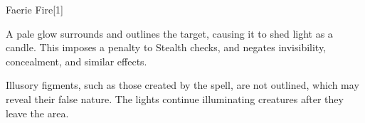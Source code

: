 
\begin{spellsection}{Faerie Fire}[1]
    \begin{spellheader}
    \end{spellheader}
    \begin{spellcontent}
        \begin{spelltargetinginfo}
        \end{spelltargetinginfo}
        \begin{spelleffects}
            \spelleffect A pale glow surrounds and outlines the target, causing it to shed light as a candle. This imposes a  penalty to Stealth checks, and negates invisibility, concealment, and similar effects.
            \spelldur \durbrief
        \end{spelleffects}
    \end{spellcontent}
    \begin{spellfooter}
        \spellnotes Illusory figments, such as those created by the  spell, are not outlined, which may reveal their false nature. The lights continue illuminating creatures after they leave the area.
        \miscastyou
    \end{spellfooter}
    \begin{spellaugments}
    \end{spellaugments}
\end{spellsection}

